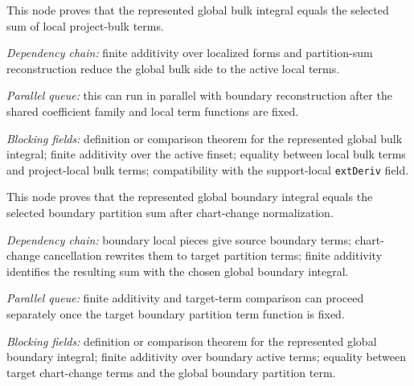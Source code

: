 \begin{theorem}
  \label{obl:m7_global_bulk_reconstruction}
  This node proves that the represented global bulk integral equals the selected
  sum of local project-bulk terms.

  \emph{Dependency chain:}
  finite additivity over localized forms and partition-sum reconstruction
  reduce the global bulk side to the active local terms.

  \emph{Parallel queue:}
  this can run in parallel with boundary reconstruction after the shared
  coefficient family and local term functions are fixed.

  \emph{Blocking fields:}
  definition or comparison theorem for the represented global bulk integral;
  finite additivity over the active finset; equality between local bulk terms
  and project-local bulk terms; compatibility with the support-local
  \texttt{extDeriv} field.
\end{theorem}

\begin{theorem}
  \label{obl:m7_global_boundary_reconstruction}
  This node proves that the represented global boundary integral equals the
  selected boundary partition sum after chart-change normalization.

  \emph{Dependency chain:}
  boundary local pieces give source boundary terms; chart-change cancellation
  rewrites them to target partition terms; finite additivity identifies the
  resulting sum with the chosen global boundary integral.

  \emph{Parallel queue:}
  finite additivity and target-term comparison can proceed separately once the
  target boundary partition term function is fixed.

  \emph{Blocking fields:}
  definition or comparison theorem for the represented global boundary
  integral; finite additivity over boundary active terms; equality between
  target chart-change terms and the global boundary partition term.
\end{theorem}

